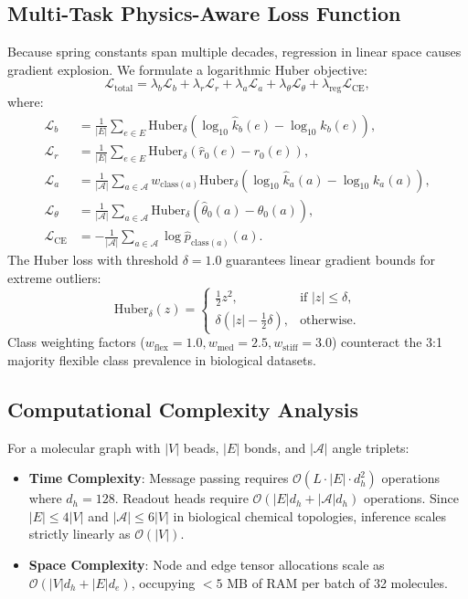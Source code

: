 \documentclass[11pt,a4paper]{article}
\begin{document}
\subsection{Multi-Task Physics-Aware Loss Function}
Because spring constants span multiple decades, regression in linear space causes gradient explosion. We formulate a logarithmic Huber objective:
\begin{equation}
\mathcal{L}_{\text{total}} = \lambda_b \mathcal{L}_b + \lambda_r \mathcal{L}_r + \lambda_a \mathcal{L}_a + \lambda_\theta \mathcal{L}_\theta + \lambda_{\text{reg}} \mathcal{L}_{\text{CE}},
\label{eq:loss_total}
\end{equation}
where:
\begin{align}
\mathcal{L}_b &= \frac{1}{|E|} \sum_{e \in E} \text{Huber}_\delta\left( \log_{10} \hat{k}_b(e) - \log_{10} k_b(e) \right), \\
\mathcal{L}_r &= \frac{1}{|E|} \sum_{e \in E} \text{Huber}_\delta\left( \hat{r}_0(e) - r_0(e) \right), \\
\mathcal{L}_a &= \frac{1}{|\mathcal{A}|} \sum_{a \in \mathcal{A}} w_{\text{class}(a)} \text{Huber}_\delta\left( \log_{10} \hat{k}_a(a) - \log_{10} k_a(a) \right), \\
\mathcal{L}_\theta &= \frac{1}{|\mathcal{A}|} \sum_{a \in \mathcal{A}} \text{Huber}_\delta\left( \hat{\theta}_0(a) - \theta_0(a) \right), \\
\mathcal{L}_{\text{CE}} &= -\frac{1}{|\mathcal{A}|} \sum_{a \in \mathcal{A}} \log \hat{p}_{\text{class}(a)}(a).
\end{align}
The Huber loss with threshold $\delta = 1.0$ guarantees linear gradient bounds for extreme outliers:
\begin{equation}
\text{Huber}_\delta(z) = \begin{cases}
\frac{1}{2} z^2, & \text{if } |z| \le \delta, \\
\delta (|z| - \frac{1}{2} \delta), & \text{otherwise}.
\end{cases}
\end{equation}
Class weighting factors ($w_{\text{flex}} = 1.0, w_{\text{med}} = 2.5, w_{\text{stiff}} = 3.0$) counteract the 3:1 majority flexible class prevalence in biological datasets.

\subsection{Computational Complexity Analysis}
For a molecular graph with $|V|$ beads, $|E|$ bonds, and $|\mathcal{A}|$ angle triplets:
\begin{itemize}
    \item \textbf{Time Complexity}: Message passing requires $\mathcal{O}(L \cdot |E| \cdot d_h^2)$ operations where $d_h = 128$. Readout heads require $\mathcal{O}(|E| d_h + |\mathcal{A}| d_h)$ operations. Since $|E| \le 4|V|$ and $|\mathcal{A}| \le 6|V|$ in biological chemical topologies, inference scales strictly linearly as $\mathcal{O}(|V|)$.
    \item \textbf{Space Complexity}: Node and edge tensor allocations scale as $\mathcal{O}(|V| d_h + |E| d_e)$, occupying $< 5\text{ MB}$ of RAM per batch of 32 molecules.
\end{itemize}
\end{document}
